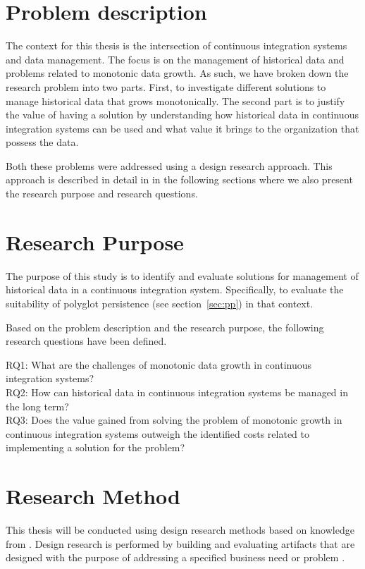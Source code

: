 \section{Problem description}
The context for this thesis is the intersection of continuous integration systems and data management. The focus is on the management of historical data and problems related to monotonic data growth. As such, we have broken down the research problem into two parts. First, to investigate different solutions to manage historical data that grows monotonically. The second part is to justify the value of having a solution by understanding how historical data in continuous integration systems can be used and what value it brings to the organization that possess the data. 

Both these problems were addressed using a design research approach. This approach is described in detail in in the following sections where we also present the research purpose and research questions.

\section{Research Purpose}
The purpose of this study is to identify and evaluate solutions for management of historical data in a continuous integration system. Specifically, to evaluate the suitability of polyglot persistence (see section~\ref{sec:pp}) in that context.

Based on the problem description and the research purpose, the following research questions have been defined.

RQ1: What are the challenges of monotonic data growth in continuous integration systems? \\
RQ2: How can historical data in continuous integration systems be managed in the long term? \\
RQ3: Does the value gained from solving the problem of monotonic growth in continuous integration systems outweigh the identified costs related to implementing a solution for the problem? \\

\section{Research Method}
This thesis will be conducted using design research methods based on knowledge from \cite{DS, Peffers, DesignEval}. Design research is performed by building and evaluating artifacts that are designed with the purpose of addressing a specified business need or problem \cite{DS}. 

